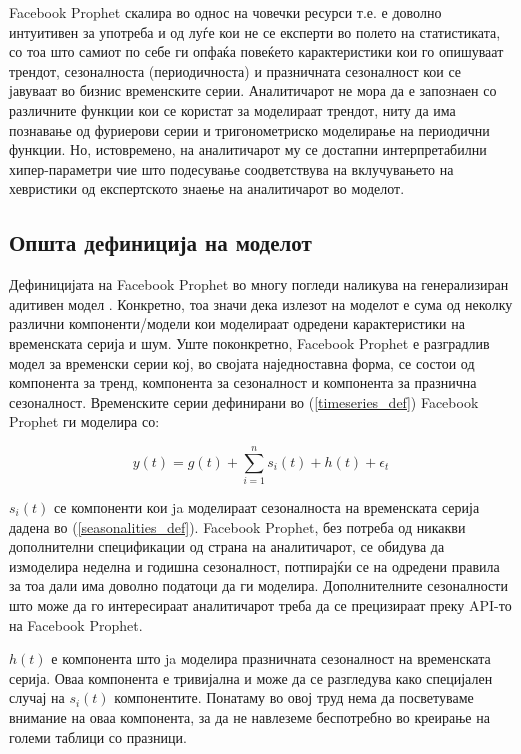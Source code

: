 \documentclass[12pt]{article}
\numberwithin{equation}{section}
\begin{document}
Facebook Prophet скалира во однос на човечки ресурси т.е. е доволно интуитивен за употреба и од луѓе кои не се експерти во полето на статистиката, со тоа што самиот по себе ги опфаќа повеќето карактеристики кои го опишуваат трендот, сезоналноста (периодичноста) и празничната сезоналност кои се јавуваат во бизнис временските серии. Аналитичарот не мора да е запознаен со различните функции кои се користат за моделираат трендот, ниту да има познавање од фуриерови серии и тригонометриско моделирање на периодични функции. Но, истовремено, на аналитичарот му се достапни интерпретабилни хипер-параметри чие што подесување соодветствува на вклучувањето на хевристики од експертското знаење на аналитичарот во моделот.

\subsection{Општа дефиниција на моделот}

Дефиницијата на Facebook Prophet во многу погледи наликува на генерализиран адитивен модел \cite{hastie1987generalized, hastie2017generalized}. Конкретно, тоа значи дека излезот на моделот е сума од неколку различни компоненти/модели кои моделираат одредени карактеристики на временската серија и шум. Уште поконкретно, Facebook Prophet е разградлив модел за временски серии \cite{harvey1990estimation} кој, во својата наједноставна форма, се состои од компонента за тренд, компонента за сезоналност и компонента за празнична сезоналност. Временските серии дефинирани во (\ref{timeseries_def}) Facebook Prophet ги моделира со:

\begin{equation}\label{fbprophet_def}
    y(t) = g(t) + \sum_{i=1}^{n}s_i(t) + h(t) + \epsilon_t
\end{equation}

\(s_i(t)\) се компоненти кои ja моделираат сезоналноста на временската серија дадена во (\ref{seasonalities_def}). Facebook Prophet, без потреба од никакви дополнителни спецификации од страна на аналитичарот, се обидува да измоделира неделна и годишна сезоналност, потпирајќи се на одредени правила за тоа дали има доволно податоци да ги моделира. Дополнителните сезоналности што може да го интересираат аналитичарот треба да се прецизираат преку API-то на Facebook Prophet.

\(h(t)\) е компонента што ja моделира празничната сезоналност на временската серија. Оваа компонента е тривијална и може да се разгледува како специјален случај на \(s_i(t)\) компонентите. Понатаму во овој труд нема да посветуваме внимание на оваа компонента, за да не навлеземе беспотребно во креирање на големи таблици со празници.
\end{document}
